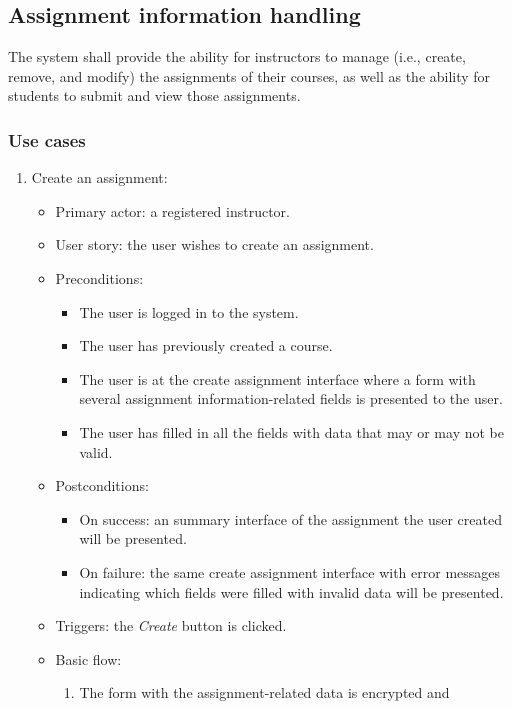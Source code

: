 \subsection{Assignment information handling}
The system shall provide the ability for instructors to manage (i.e., create,
remove, and modify) the assignments of their courses, as well as the ability for
students to submit and view those assignments.

\subsubsection{Use cases}
\begin{enumerate}
\item Create an assignment:
\begin{itemize}
    \item Primary actor: a registered instructor.
    \item User story: the user wishes to create an assignment.
    \item Preconditions:
        \begin{itemize}
            \item The user is logged in to the system.
            \item The user has previously created a course.
            \item The user is at the create assignment interface where a form
                with several assignment information-related fields is
                presented to the user.
            \item The user has filled in all the fields with data that may
                or may not be valid.
        \end{itemize}
    \item Postconditions:
        \begin{itemize}
            \item On success: an summary interface of the assignment the user
                created will be presented.
            \item On failure: the same create assignment interface with error
                messages indicating which fields were filled with invalid data
                will be presented.
        \end{itemize}
    \item Triggers: the \emph{Create} button is clicked.
    \item Basic flow:
        \begin{enumerate}
            \item The form with the assignment-related data is encrypted and

\end{enumerate}
\end{itemize}
\end{enumerate}
